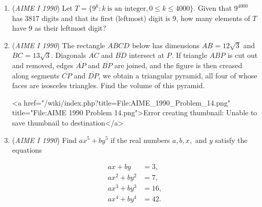 \begin{enumerate}
 $a + b \sqrt{2} + c \sqrt{3} + d \sqrt{6},$

 where $a^{}_{}$, $b^{}_{}$, $c^{}_{}$, and $d^{}_{}$ are positive integers.  Find $a + b + c + d^{}_{}$.


 

	\item (\textit{AIME I 1990}) Let $T = \{9^k : k ~ \mbox{is an integer}, 0 \le k \le 4000\}$.  Given that $9^{4000}_{}$ has 3817 digits and that its first (leftmost) digit is 9, how many elements of $T_{}^{}$ have 9 as their leftmost digit?


 

	\item (\textit{AIME I 1990}) The rectangle $ABCD^{}_{}$ below has dimensions $AB^{}_{} = 12 \sqrt{3}$ and $BC^{}_{} = 13 \sqrt{3}$.  Diagonals $\overline{AC}$ and $\overline{BD}$ intersect at $P^{}_{}$.  If triangle $ABP^{}_{}$ is cut out and removed, edges $\overline{AP}$ and $\overline{BP}$ are joined, and the figure is then creased along segments $\overline{CP}$ and $\overline{DP}$, we obtain a triangular pyramid, all four of whose faces are isosceles triangles.  Find the volume of this pyramid.


 <a href="/wiki/index.php?title=File:AIME\_1990\_Problem\_14.png" title="File:AIME 1990 Problem 14.png">Error creating thumbnail: Unable to save thumbnail to destination</a>


	\item (\textit{AIME I 1990}) Find $ax^5 + by^5$ if the real numbers $a,b,x,$ and $y$ satisfy the equations

 \begin{align*} ax + by &= 3, \\ ax^2 + by^2 &= 7, \\ ax^3 + by^3 &= 16, \\ ax^4 + by^4 &= 42. \end{align*}



\end{enumerate}